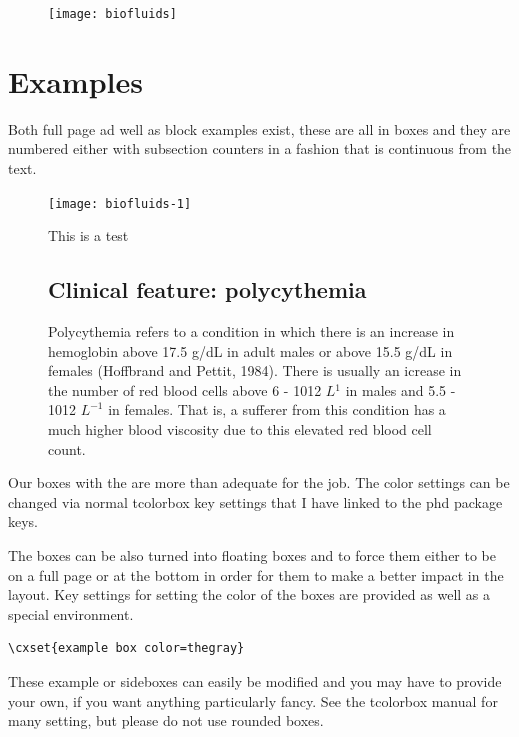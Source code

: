 \begin{figure}[ht]
\centering
\texttt{[image: biofluids]}
\end{figure}
\lipsum[2]

\lipsum[1]
\section{Examples}
Both full page ad well as block examples exist, these are all in boxes and they are numbered either with subsection counters in a fashion that is continuous from the text. 
\begin{figure}[ht]
\centering
\texttt{[image: biofluids-1]}
\end{figure}
\lipsum[2-4]

\begin{figure}[!b]
\begin{scriptexample}{This is a test}{}
\subsection{Clinical feature: polycythemia}

Polycythemia refers to a condition in which there is an increase in hemoglobin
above 17.5 g/dL in adult males or above 15.5 g/dL in females
(Hoffbrand and Pettit, 1984). There is usually an icrease in the number of
red blood cells above 6 - 1012 $L{^1}$ in males and 5.5 - 1012 $L^{-1}$ in females.
That is, a sufferer from this condition has a much higher blood viscosity due
to this elevated red blood cell count.
\end{scriptexample}
\end{figure}

Our boxes with the  are more than adequate for the job. The color settings can be changed via normal tcolorbox key settings that I have linked to the phd package keys.

The boxes can be also turned into floating boxes and to force them either to be on a full page or at the bottom in order for them to make a better impact in the layout. Key settings for setting the color of the boxes are provided
as well as a special environment.

\begin{verbatim}
\cxset{example box color=thegray}
\end{verbatim}

These example or sideboxes can easily be modified and you may have to provide your own, if you want anything particularly fancy. See the tcolorbox manual for many setting, but please do not use rounded boxes. 
%